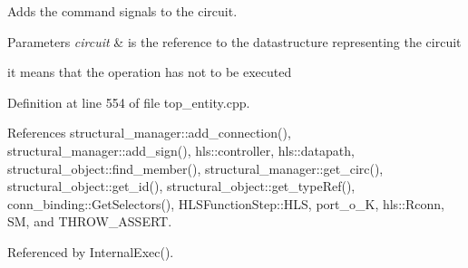 Adds the command signals to the circuit. 


\begin{DoxyParams}{Parameters}
{\em circuit} & is the reference to the datastructure representing the circuit \\
\hline
\end{DoxyParams}
it means that the operation has not to be executed 

Definition at line 554 of file top\+\_\+entity.\+cpp.



References structural\+\_\+manager\+::add\+\_\+connection(), structural\+\_\+manager\+::add\+\_\+sign(), hls\+::controller, hls\+::datapath, structural\+\_\+object\+::find\+\_\+member(), structural\+\_\+manager\+::get\+\_\+circ(), structural\+\_\+object\+::get\+\_\+id(), structural\+\_\+object\+::get\+\_\+type\+Ref(), conn\+\_\+binding\+::\+Get\+Selectors(), H\+L\+S\+Function\+Step\+::\+H\+LS, port\+\_\+o\+\_\+K, hls\+::\+Rconn, SM, and T\+H\+R\+O\+W\+\_\+\+A\+S\+S\+E\+RT.



Referenced by Internal\+Exec().

